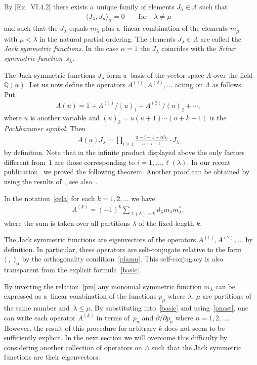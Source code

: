 By [Ex.~VI.4.2] there exists a~unique family of elements $J_\lambda\in\Lambda$ such that
\begin{gather}
\label{plamu}
\langle J_\lambda,J_\mu\rangle_\alpha=0
\qquad
\text{for}
\quad
\lambda\neq\mu
\end{gather}
and such that the $J_\lambda$ equals $m_\lambda$ plus a~linear combination of the elements $m_\mu$ with
$\mu<\lambda$ in the natural partial ordering.
The elements $J_\lambda\in\Lambda$ are called the \textit{Jack symmetric functions}.
In the case $\alpha=1$ the $J_\lambda$ coincides with the \emph{Schur symmetric function}~$s_\lambda$.

The Jack symmetric functions $J_\lambda$ form a~basis of the vector space $\Lambda$ over the f\/ield
$\mathbb Q(\alpha)$.
Let us now def\/ine the operators $A^{(1)},A^{(2)},\ldots$ acting on
$\Lambda$ as follows.
Put
\begin{gather}
\label{au}
A(u)=1+A^{(1)}/(u)_1+A^{(2)}/(u)_2+\cdots,
\end{gather}
where $u$ is another variable and $(u)_k=u(u+1)\cdots(u+k-1)$ is the \emph{Pochhammer symbol}.
Then
\begin{gather}
\label{ajack}
A(u)J_\lambda=\prod_{i\ge1}\frac{u+i-1-\alpha\lambda_i}{u+i-1}\cdot J_\lambda
\end{gather}
by def\/inition.
Note that in the inf\/inite product displayed above the only factors dif\/ferent from~$1$ are those
corresponding to $i=1,\ldots,\ell(\lambda)$.
In our recent publication~\cite{NS1} we proved the following theorem.
Another proof can be obtained by using the results of~\cite{Shi}, see also~\cite{NS2}.
\begin{theorem}\label{Theorem1}
In the notation~\eqref{cela} for each $k=1,2,\ldots$ we have
\begin{gather}
\label{basic}
A^{(k)}=(-1)^k\sum_{\ell(\lambda)=k}d_\lambda m_\lambda m_\lambda^{\ast},
\end{gather}
where the sum is taken over all partitions $\lambda$ of the fixed length $k$.
\end{theorem}

The Jack symmetric functions are eigenvectors of the operators
$A^{(1)},A^{(2)},\ldots$ by def\/inition.
In particular, these operators are self-conjugate relative to the form $\langle\;,\;\rangle_\alpha$ by the
orthogonality condition~\eqref{plamu}.
This self-conjugacy is also transparent from the explicit formula~\eqref{basic}.

By inverting the relation~\eqref{pm} any monomial symmetric function $m_\lambda$ can be expressed as
a~linear combination of the functions $p_\mu$ where $\lambda$, $\mu$ are partitions of the same number and~$\lambda\le\mu$.
By substituting into~\eqref{basic} and using~\eqref{pnast}, one can write each operator
$A^{(k)}$ in terms of~$p_n$ and $\partial /\partial  p_{n}$ where $n=1,2,\ldots$.
However, the result of this procedure for arbitrary $k$ does not seem to be suf\/f\/iciently explicit.
In the next section we will overcome this dif\/f\/iculty by considering another collection of operators on
$\Lambda$ such that the Jack symmetric functions are their eigenvectors.

